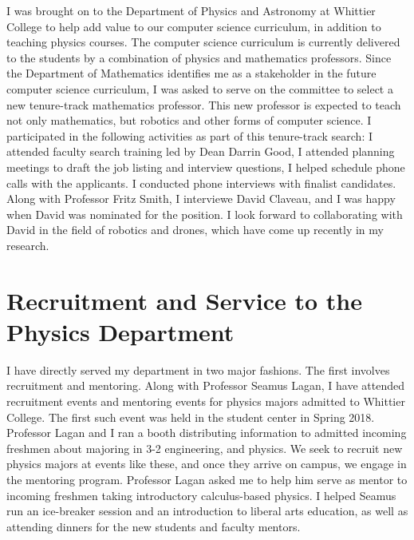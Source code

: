 \documentclass[../main.tex]{subfiles}
\begin{document}
I was brought on to the Department of Physics and Astronomy at Whittier College to help add value to our computer science curriculum, in addition to teaching physics courses.  The computer science curriculum is currently delivered to the students by a combination of physics and mathematics professors.  Since the Department of Mathematics identifies me as a stakeholder in the future computer science curriculum, I was asked to serve on the committee to select a new tenure-track mathematics professor.  This new professor is expected to teach not only mathematics, but robotics and other forms of computer science.  I participated in the following activities as part of this tenure-track search: I attended faculty search training led by Dean Darrin Good, I attended planning meetings to draft the job listing and interview questions, I helped schedule phone calls with the applicants.  I conducted phone interviews with finalist candidates.  Along with Professor Fritz Smith, I interviewe David Claveau, and I was happy when David was nominated for the position.  I look forward to collaborating with David in the field of robotics and drones, which have come up recently in my research. \\ \hspace{0.1cm}

\section{Recruitment and Service to the Physics Department}

I have directly served my department in two major fashions.  The first involves recruitment and mentoring.  Along with Professor Seamus Lagan, I have attended recruitment events and mentoring events for physics majors admitted to Whittier College.  The first such event was held in the student center in Spring 2018.  Professor Lagan and I ran a booth distributing information to admitted incoming freshmen about majoring in 3-2 engineering, and physics.  We seek to recruit new physics majors at events like these, and once they arrive on campus, we engage in the mentoring program.  Professor Lagan asked me to help him serve as mentor to incoming freshmen taking introductory calculus-based physics.  I helped Seamus run an ice-breaker session and an introduction to liberal arts education, as well as attending dinners for the new students and faculty mentors.  \\ \hspace{0.1cm}
\end{document}
